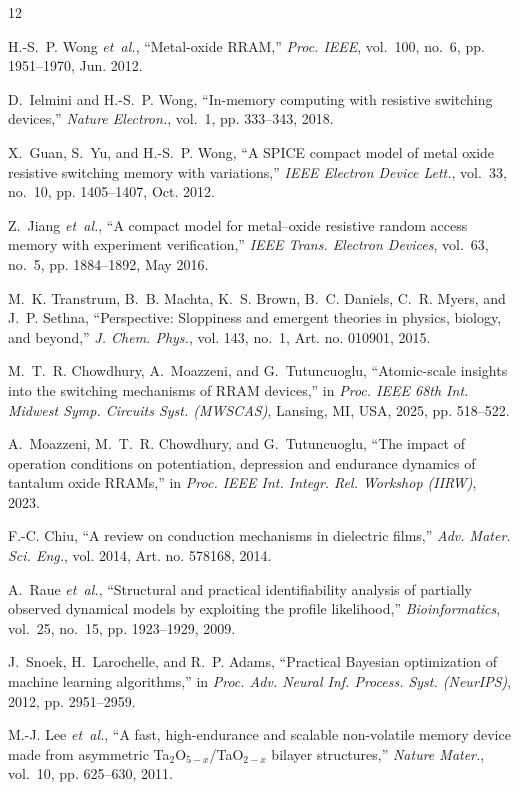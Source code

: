 \documentclass[journal]{IEEEtran}
\begin{document}
\begin{thebibliography}{12}\footnotesize

H.-S.~P. Wong \emph{et~al.}, ``Metal-oxide RRAM,'' \emph{Proc. IEEE},
vol.~100, no.~6, pp. 1951--1970, Jun. 2012.

D.~Ielmini and H.-S.~P. Wong, ``In-memory computing with resistive switching
devices,'' \emph{Nature Electron.}, vol.~1, pp. 333--343, 2018.

X.~Guan, S.~Yu, and H.-S.~P. Wong, ``A SPICE compact model of metal oxide
resistive switching memory with variations,'' \emph{IEEE Electron Device
Lett.}, vol.~33, no.~10, pp. 1405--1407, Oct. 2012.

Z.~Jiang \emph{et~al.}, ``A compact model for metal--oxide resistive random
access memory with experiment verification,'' \emph{IEEE Trans. Electron
Devices}, vol.~63, no.~5, pp. 1884--1892, May 2016.

M.~K. Transtrum, B.~B. Machta, K.~S. Brown, B.~C. Daniels, C.~R. Myers, and
J.~P. Sethna, ``Perspective: Sloppiness and emergent theories in physics,
biology, and beyond,'' \emph{J. Chem. Phys.}, vol. 143, no.~1, Art. no.
010901, 2015.

M.~T.~R. Chowdhury, A.~Moazzeni, and G.~Tutuncuoglu, ``Atomic-scale insights
into the switching mechanisms of RRAM devices,'' in \emph{Proc. IEEE 68th
Int. Midwest Symp. Circuits Syst. (MWSCAS)}, Lansing, MI, USA, 2025,
pp. 518--522.

A.~Moazzeni, M.~T.~R. Chowdhury, and G.~Tutuncuoglu, ``The impact of
operation conditions on potentiation, depression and endurance dynamics of
tantalum oxide RRAMs,'' in \emph{Proc. IEEE Int. Integr. Rel. Workshop
(IIRW)}, 2023.

F.-C. Chiu, ``A review on conduction mechanisms in dielectric films,''
\emph{Adv. Mater. Sci. Eng.}, vol. 2014, Art. no. 578168, 2014.

A.~Raue \emph{et~al.}, ``Structural and practical identifiability analysis
of partially observed dynamical models by exploiting the profile
likelihood,'' \emph{Bioinformatics}, vol.~25, no.~15, pp. 1923--1929, 2009.

J.~Snoek, H.~Larochelle, and R.~P. Adams, ``Practical Bayesian optimization
of machine learning algorithms,'' in \emph{Proc. Adv. Neural Inf. Process.
Syst. (NeurIPS)}, 2012, pp. 2951--2959.

M.-J. Lee \emph{et~al.}, ``A fast, high-endurance and scalable non-volatile
memory device made from asymmetric Ta$_2$O$_{5-x}$/TaO$_{2-x}$ bilayer
structures,'' \emph{Nature Mater.}, vol.~10, pp. 625--630, 2011.

\end{thebibliography}
\end{document}
